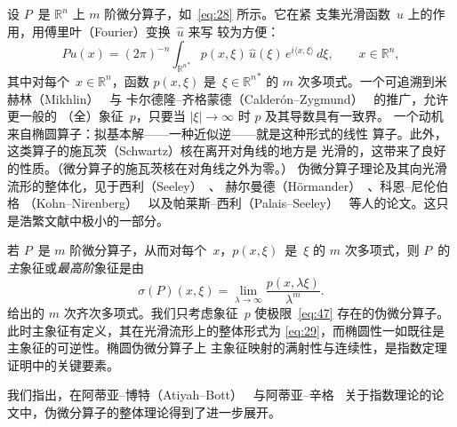 \documentclass[11pt]{amsart}
\theoremstyle{definition}
\theoremstyle{remark}
\theoremstyle{plain}
\numberwithin{equation}{section}
\renewcommand{\:}{\colon}
\newcommand{\RR}{{\mathbb R}}
\begin{document}
设 $P$~是 $\RR^n$ 上 $m$ 阶微分算子，如~\eqref{eq:28} 所示。它在紧
支集光滑函数~$u$ 上的作用，用傅里叶（Fourier）变换~$\hat{u}$ 来写
较为方便：
  \begin{equation}\label{eq:46}
     Pu(x) = (2\pi )^{-n}\int_{{\RR^n}^*} p(x,\xi )\,\hat{u}(\xi )\,e^{i\langle
     x,\xi \rangle} \,d\xi ,\qquad x\in \RR^n, 
  \end{equation}
其中对每个~$x\in \RR^n$，函数 $p(x,\xi )$ 是~$\xi \in {\RR^n}^*$ 的
$m$ 次多项式。一个可追溯到米赫林（Mikhlin）~\cite{Mik} 与
卡尔德隆–齐格蒙德（Calderón–Zygmund）~\cite{CZ} 的推广，允许更一般的
（全）象征~$p$，只要当 $|\xi |\to\infty $ 时 $p$ 及其导数具有一致界。
一个动机来自椭圆算子：拟基本解——一种近似逆——就是这种形式的线性
算子。此外，这类算子的施瓦茨（Schwartz）核在离开对角线的地方是
光滑的，这带来了良好的性质。（微分算子的施瓦茨核在对角线之外为零。）
伪微分算子理论及其向光滑流形的整体化，见于西利（Seeley）~\cite{Se2,Se3}、
赫尔曼德（Hörmander）~\cite{Ho2,Ho3}、科恩–尼伦伯格
（Kohn–Nirenberg）~\cite{KN} 以及帕莱斯–西利（Palais–Seeley）~\cite{PS}
等人的论文。这只是浩繁文献中极小的一部分。


若 $P$~是 $m$ 阶微分算子，从而对每个~$x$，$p(x,\xi )$~是~$\xi $ 的
$m$ 次多项式，则 $P$~的\emph{主}象征或\emph{最高阶}象征是由
  \begin{equation}\label{eq:47}
     \sigma (P)(x,\xi ) = \lim\limits_{\lambda \to\infty }\frac{p(x,\lambda
     \xi )}{\lambda ^m}. 
  \end{equation}
给出的 $m$ 次齐次多项式。我们只考虑象征~$p$ 使极限~\eqref{eq:47}
存在的伪微分算子。此时主象征有定义，其在光滑流形上的整体形式为
\eqref{eq:29}，而椭圆性一如既往是主象征的可逆性。椭圆伪微分算子上
主象征映射的满射性与连续性，是指数定理证明中的关键要素。


我们指出，在阿蒂亚–博特（Atiyah–Bott）~\cite{AB1} 与阿蒂亚–辛格~\cite{AS2,AS4}
关于指数理论的论文中，伪微分算子的整体理论得到了进一步展开。
\end{document}
